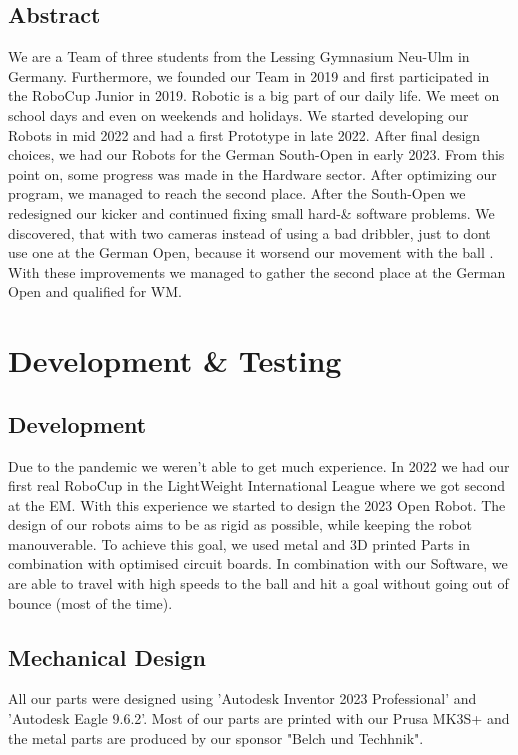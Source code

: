 \documentclass{scrartcl}
\begin{document}
\subsection{Abstract}
We are a Team of three students from the Lessing Gymnasium Neu-Ulm in Germany. Furthermore, we founded our Team
in 2019 and first participated in the RoboCup Junior in 2019. Robotic is a big part of our daily life.
We meet on school days and even on weekends and holidays.
\newline
\newline
We started developing our Robots in mid 2022 and had a first Prototype in late 2022. After final design
choices, we had our Robots for the German South-Open in early 2023. From this point on, some progress was
made in the Hardware sector.
After optimizing our program, we managed to reach the second place.
\newline
After the South-Open we redesigned our kicker and continued fixing small hard-\& software problems. We discovered, that with two cameras
instead of using a bad dribbler, just to dont use one at the German Open, because it worsend our movement with the ball .
With these improvements we managed to gather the second place at the German Open and qualified for WM.

\section{Development \& Testing}

\subsection{Development}
Due to the pandemic we weren't able to get much experience. In 2022 we had our first real RoboCup
in the LightWeight International League where we got second at the EM. With this experience we started to design the 2023 Open Robot.
\newline
The design of our robots aims to be as rigid as possible, while keeping the robot manouverable.
To achieve this goal, we used metal and 3D printed Parts in combination with optimised circuit boards.
In combination with our Software, we are able to travel with high speeds to the ball and
hit a goal without going out of bounce (most of the time).

\subsection{Mechanical Design}
All our parts were designed using 'Autodesk Inventor 2023 Professional' and 'Autodesk Eagle 9.6.2'.
Most of our parts are printed with our Prusa MK3S+ and the metal parts are produced
by our sponsor "Belch und Techhnik".
\newline
\newline
\end{document}
